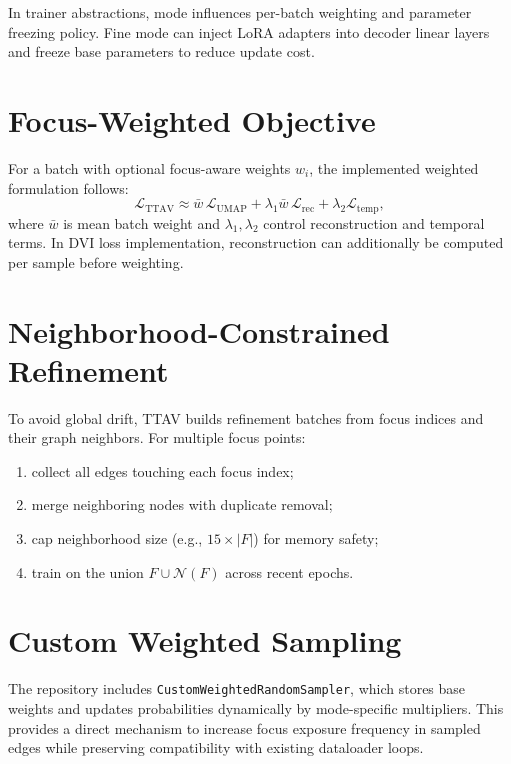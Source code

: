 \documentclass[12pt,a4paper]{report}
\newcommand{\systemname}{TTAV}
\begin{document}
In trainer abstractions, mode influences per-batch weighting and parameter freezing policy. Fine mode can inject LoRA adapters into decoder linear layers and freeze base parameters to reduce update cost.

\section{Focus-Weighted Objective}
For a batch with optional focus-aware weights \(w_i\), the implemented weighted formulation follows:
\begin{equation}
\mathcal{L}_{\text{TTAV}} \approx \bar{w}\,\mathcal{L}_{\text{UMAP}} + \lambda_1 \bar{w}\,\mathcal{L}_{\text{rec}} + \lambda_2 \mathcal{L}_{\text{temp}},
\end{equation}
where \(\bar{w}\) is mean batch weight and \(\lambda_1,\lambda_2\) control reconstruction and temporal terms. In DVI loss implementation, reconstruction can additionally be computed per sample before weighting.

\section{Neighborhood-Constrained Refinement}
To avoid global drift, \systemname{} builds refinement batches from focus indices and their graph neighbors. For multiple focus points:
\begin{enumerate}
\item collect all edges touching each focus index;
\item merge neighboring nodes with duplicate removal;
\item cap neighborhood size (e.g., \(15\times |F|\)) for memory safety;
\item train on the union \(F \cup \mathcal{N}(F)\) across recent epochs.
\end{enumerate}

\section{Custom Weighted Sampling}
The repository includes \texttt{CustomWeightedRandomSampler}, which stores base weights and updates probabilities dynamically by mode-specific multipliers. This provides a direct mechanism to increase focus exposure frequency in sampled edges while preserving compatibility with existing dataloader loops.
\end{document}
